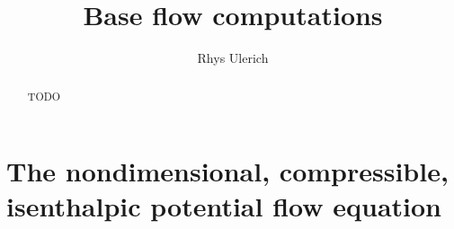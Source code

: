 \documentclass[letterpaper,11pt,nointlimits,reqno]{amsart}
\begin{document}
\title{Base flow computations}
\author{Rhys Ulerich}

\begin{abstract}
TODO
\end{abstract}

\maketitle

\tableofcontents

\section{The nondimensional, compressible, isenthalpic potential flow equation}

\newcommand*{\doi}[1]{\href{http://dx.doi.org/\detokenize{#1}}{doi: #1}}


\end{document}
